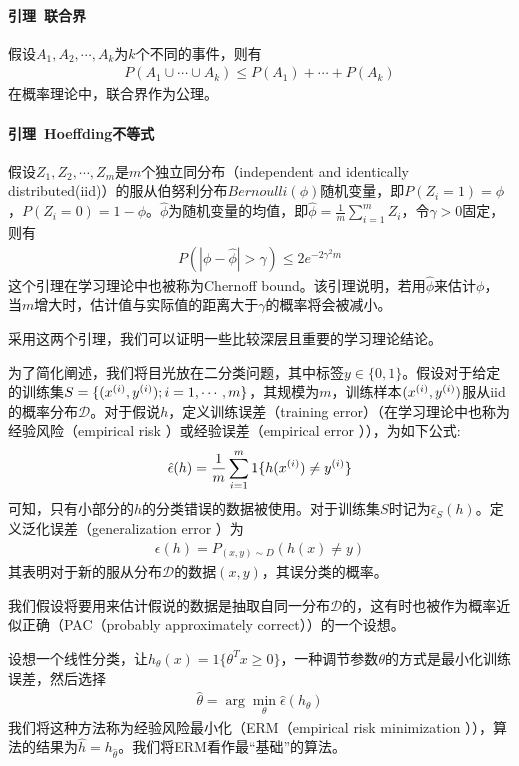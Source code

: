 \paragraph{引理\ 联合界}假设$A_1,A_2,\cdots,A_k$为$k$个不同的事件，则有
\begin{eqnarray}
P(A_1\cup\cdots\cup A_k)\leq P(A_1)+\cdots+P(A_k)
\end{eqnarray}
在概率理论中，联合界作为公理。

\paragraph{引理\ Hoeffding不等式}假设$Z_1,Z_2,\cdots,Z_m$是$m$个独立同分布（independent and identically distributed(iid)）的服从伯努利分布$Bernoulli(\phi)$随机变量，即$P(Z_i=1)=\phi$，$P(Z_i=0)=1-\phi$。$\hat{\phi}$为随机变量的均值，即$\hat{\phi}=\frac{1}{m}\sum_{i=1}^mZ_i$，令$\gamma>0$固定，则有
\begin{eqnarray}
P(|\phi-\hat{\phi}|>\gamma)\leq 2e^{-2\gamma^2m}
\end{eqnarray}
这个引理在学习理论中也被称为Chernoff bound。该引理说明，若用$\hat{\phi}$来估计$\phi$，当$m$增大时，估计值与实际值的距离大于$\gamma$的概率将会被减小。

采用这两个引理，我们可以证明一些比较深层且重要的学习理论结论。

为了简化阐述，我们将目光放在二分类问题，其中标签$y\in\{0,1\}$。假设对于给定的训练集$S=\{({x}^{({i})},{y}^{({i})});i=1,\cdots,m\}$，其规模为$m$，训练样本$({x}^{({i})},{y}^{({i})})$服从iid的概率分布$\mathcal{D}$。对于假说$h$，定义训练误差（training error）（在学习理论中也称为经验风险（empirical risk ）或经验误差（empirical error ）），为如下公式:
\begin{eqnarray}
\hat{\epsilon}(h)=\frac{1}{m}\sum_{i=1}^m1\{h({x}^{({i})})\neq{y}^{({i})}\}
\end{eqnarray}
可知，只有小部分的$h$的分类错误的数据被使用。对于训练集$S$时记为$\hat{\epsilon}_S(h)$。定义泛化误差（generalization error ）为
\begin{eqnarray}
\epsilon(h)=P_{(x,y)\sim D}(h(x)\neq y)
\end{eqnarray}
其表明对于新的服从分布$\mathcal{D}$的数据$(x,y)$，其误分类的概率。

我们假设将要用来估计假说的数据是抽取自同一分布$\mathcal{D}$的，这有时也被作为概率近似正确（PAC（probably approximately correct））的一个设想。

设想一个线性分类，让$h_\theta(x)=1\{\theta^Tx\geq0\}$，一种调节参数$\theta$的方式是最小化训练误差，然后选择
\begin{eqnarray}
\hat{\theta}=\arg\min_\theta\hat{\epsilon}(h_\theta)
\end{eqnarray}
我们将这种方法称为经验风险最小化（ERM（empirical risk minimization ）），算法的结果为$\hat{h}=h_\hat{\theta}$。我们将ERM看作最“基础”的算法。

